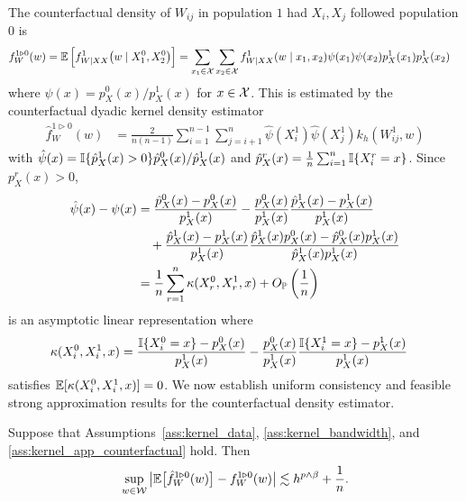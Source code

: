 The counterfactual density of $W_{i j}$ in population $1$ had $X_i, X_j$
followed population $0$ is
%
\begin{align*}
  f_W^{1 \triangleright 0}(w)
  &=
  \E\left[
    f_{W \mid XX}^1\big(w \mid X_1^0, X_2^0\big)
  \right]
  = \sum_{x_1 \in \cX}
  \sum_{x_2 \in \cX}
  f_{W \mid XX}^{1}(w \mid x_1, x_2)
  \psi(x_1)
  \psi(x_2)
  p_X^{1}(x_1)
  p_X^{1}(x_2)
\end{align*}
%
where $\psi(x) = p_X^0(x)/p_X^1(x)$ for $x \in \cX$.
This is estimated by
the counterfactual dyadic kernel density estimator
%
\begin{align*}
  \hat f_W^{1 \triangleright 0}(w)
  &=
  \frac{2}{n(n-1)}
  \sum_{i=1}^{n-1}
  \sum_{j=i+1}^n
  \hat \psi(X_i^1)
  \hat \psi(X_j^1)
  k_h(W_{i j}^1, w)
\end{align*}
%
with
$\hat\psi(x) =
\I\{\hat p_X^{1}(x) > 0\}\hat p_X^{0}(x) / \hat p_X^{1}(x)$
and $\hat p_X^{r}(x) = \frac{1}{n}\sum_{i = 1}^n \I\{X_i^r = x\}$.
Since $p_X^r(x) > 0$,
%
\begin{align*}
  \hat\psi(x) - \psi(x)
  &=
  \frac{\hat p_X^{0}(x) - p_X^0(x)}{p_X^1(x)}
  - \frac{p_X^0(x)}{p_X^1(x)}
  \frac{\hat p_X^{1}(x) - p_X^1(x)}{p_X^1(x)} \\
  &\quad+
  \frac{\hat p_X^{1}(x) - p_X^1(x)}{p_X^1(x)}
  \frac{\hat p_X^{1}(x) p_X^0(x) - \hat p_X^{0}(x)p_X^1(x)}
  {\hat p_X^{1}(x) p_X^1(x)} \\
  &=
  \frac{1}{n}
  \sum_{r=1}^n \kappa(X_r^0, X_r^1, x)
  + O_\P\left(\frac{1}{n}\right)
\end{align*}
%
is an asymptotic linear representation where
%
\begin{align*}
  \kappa(X_i^0, X_i^1, x)
  &=
  \frac{\I\{X_i^0 = x\} - p_X^0(x)}{p_X^1(x)}
  - \frac{p_X^0(x)}{p_X^1(x)}
  \frac{\I\{X_i^1 = x\} - p_X^1(x)}{p_X^1(x)}
\end{align*}
%
satisfies
$\E[\kappa(X_i^0, X_i^1, x)] = 0$.
We now establish uniform consistency and feasible strong
approximation results for the counterfactual density estimator.

\begin{lemma}
  \label{lem:kernel_app_counterfactual_bias}

  Suppose that Assumptions~\ref{ass:kernel_data},
  \ref{ass:kernel_bandwidth}, and \ref{ass:kernel_app_counterfactual} hold.
  Then
  \begin{align*}
    \sup_{w \in \cW}
    \big|
    \E\big[\hat f_W^{1 \triangleright 0}(w)\big]
    - f_W^{1 \triangleright 0}(w)
    \big|
    \lesssim
    h^{p \wedge \beta} + \frac{1}{n}.
  \end{align*}

\end{lemma}

